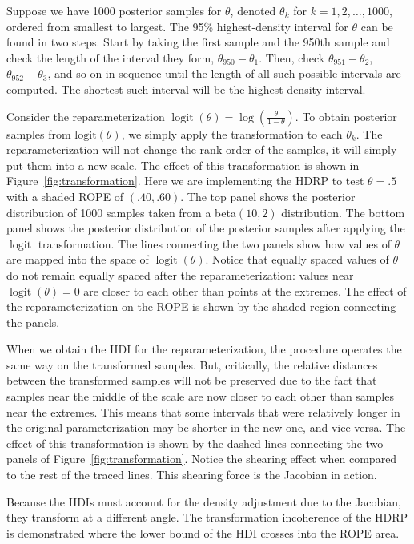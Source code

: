 \documentclass[9pt,twocolumn,twoside]{cidlab-draft}\templatetype{cidlab-invited}
\newcommand{\hdr}{HDRP}
\DeclareMathOperator*{\logit}{logit}
\begin{document}
Suppose we have 1000 posterior samples for $\theta$, denoted $\theta_k$ for $k=1,2,\dots,1000$, ordered from smallest to largest. The 95\% highest-density interval for $\theta$ can be found in two steps. Start by taking the first sample and the 950th sample and check the length of the interval they form, $\theta_{950} - \theta_1$. Then, check $\theta_{951}-\theta_2$, $\theta_{952}-\theta_3$, and so on in sequence until the length of all such possible intervals are computed. The shortest such interval will be the highest density interval. 

Consider the reparameterization $\logit(\theta)=\log\left(\frac{\theta}{1-\theta}\right)$. To obtain posterior samples from $\text{logit}(\theta)$, we simply apply the transformation to each $\theta_k$. The reparameterization will not change the rank order of the samples, it will simply put them into a new scale. The effect of this transformation is shown in Figure~\ref{fig:transformation}. Here we are implementing the \hdr{} to test $\theta=.5$ with a shaded ROPE of $(.40, .60)$. The top panel shows the posterior distribution of 1000 samples taken from a beta$(10,2)$ distribution. The bottom panel shows the posterior distribution of the posterior samples after applying the $\logit$ transformation. The lines connecting the two panels show how values of $\theta$ are mapped into the space of $\logit(\theta)$. Notice that equally spaced values of $\theta$ do not remain equally spaced after the reparameterization: values near $\logit(\theta)=0$ are closer to each other than points at the extremes. The effect of the reparameterization on the ROPE is shown by the shaded region connecting the panels. 

When we obtain the HDI for the reparameterization, the procedure operates the same way on the transformed samples. But, critically, the relative distances between the transformed samples will not be preserved due to the fact that samples near the middle of the scale are now closer to each other than samples near the extremes. This means that some intervals that were relatively longer in the original parameterization may be shorter in the new one, and vice versa. The effect of this transformation is shown by the dashed lines connecting the two panels of Figure~\ref{fig:transformation}. Notice the shearing effect when compared to the rest of the traced lines. This shearing force is the Jacobian in action. 

Because the HDIs must account for the density adjustment due to the Jacobian, they transform at a different angle. The transformation incoherence of the \hdr{} is demonstrated where the lower bound of the HDI crosses into the ROPE area. 
\end{document}
